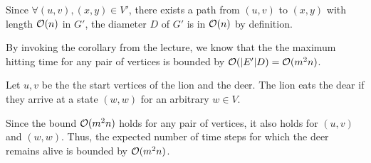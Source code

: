 Since $\forall (u,v), (x,y) \in V'$, there exists a path from $(u, v)$ to $(x, y)$ with length $\mathcal{O}(n)$ in $G'$, the diameter $D$ of $G'$ is in $\mathcal{O}(n)$ by definition.

By invoking the corollary from the lecture, we know that the the maximum hitting 
time for any pair of vertices is bounded by $\mathcal{O}(|E'|D) = \mathcal{O}(m^2n)$. 

Let $u, v$ be the the start vertices of the lion and the deer. The lion eats the dear if they arrive at a state $(w, w)$ for an arbitrary $w \in V$.

Since the bound $\mathcal{O}(m^2n)$ holds for any pair of vertices, it also holds for $(u,v)$ and $(w, w)$. Thus, the expected number of time steps for which the deer remains alive is bounded by $\mathcal{O}(m^2n)$.


\pagebreak 